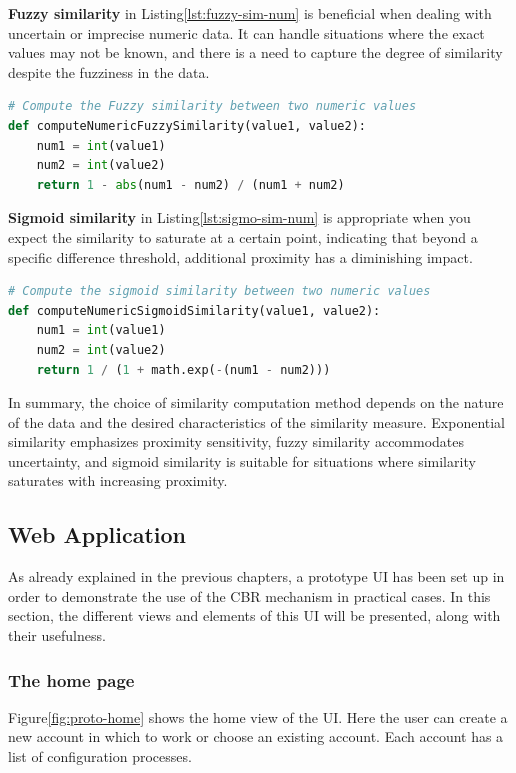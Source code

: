     
    \textbf{Fuzzy similarity} in Listing\ref{lst:fuzzy-sim-num} is beneficial when dealing with uncertain or imprecise numeric data. It can handle situations where the exact values may not be known, and there is a need to capture the degree of similarity despite the fuzziness in the data.\\
\begin{lstlisting}[language=Python, caption=Function to compute the similarity value between two attributes, label={lst:fuzzy-sim-num}]
# Compute the Fuzzy similarity between two numeric values
def computeNumericFuzzySimilarity(value1, value2):
    num1 = int(value1)
    num2 = int(value2)
    return 1 - abs(num1 - num2) / (num1 + num2)
\end{lstlisting}

    
    \textbf{Sigmoid similarity} in Listing\ref{lst:sigmo-sim-num} is appropriate when you expect the similarity to saturate at a certain point, indicating that beyond a specific difference threshold, additional proximity has a diminishing impact.\\

\begin{lstlisting}[language=Python, caption=Function to compute the similarity value between two attributes, label={lst:sigmo-sim-num}]
# Compute the sigmoid similarity between two numeric values
def computeNumericSigmoidSimilarity(value1, value2):
    num1 = int(value1)
    num2 = int(value2)
    return 1 / (1 + math.exp(-(num1 - num2)))
\end{lstlisting}
        
In summary, the choice of similarity computation method depends on the nature of the data and the desired characteristics of the similarity measure. Exponential similarity emphasizes proximity sensitivity, fuzzy similarity accommodates uncertainty, and sigmoid similarity is suitable for situations where similarity saturates with increasing proximity.

\subsection{Web Application}
As already explained in the previous chapters, a prototype UI has been set up in order to demonstrate the use of the CBR mechanism in practical cases. In this section, the different views and elements of this UI will be presented, along with their usefulness.

    \subsubsection{The home page}
    Figure\ref{fig:proto-home} shows the home view of the UI. Here the user can create a new account in which to work or choose an existing account. Each account has a list of configuration processes.
    
